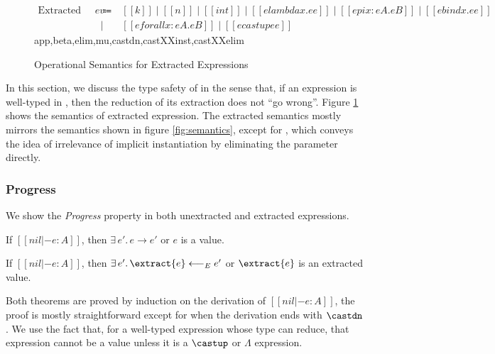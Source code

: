 \begin{figure}
  \centering
  \begin{equation*}
  \begin{array}{lcl}
      \text{Extracted Value} ~ ev & ~ \Coloneqq ~ & [[k]] \mid [[n]] \mid [[int]] \mid [[elambda x. ee]] \mid [[epi x : eA. eB]] \mid [[ebind x. ee]] \\
      & \mid & [[eforall x : eA. eB]] \mid [[ecastup ee]]
  \end{array}
  \end{equation*}
    {app,beta,elim,mu,castdn,castXXinst,castXXelim}
  \label{fig:extract-semantics}
  \caption{Operational Semantics for Extracted Expressions}
\end{figure}

In this section, we discuss the type safety of \name in the sense that,
if an expression is well-typed in \name, then the reduction of its extraction
does not ``go wrong''. Figure \ref{fig:extract-semantics} shows the semantics of
extracted expression. The extracted semantics mostly mirrors the semantics
shown in figure \ref{fig:semantics}, except for , which
conveys the idea of irrelevance of implicit instantiation by eliminating the
parameter directly.

\subsubsection{Progress} We show the \emph{Progress} property in both unextracted
and extracted expressions.

\begin{theorem}[Progress]
    If $[[nil |- e : A]]$,
    then $\exists \, e'. \, e \longrightarrow e'$ or $e$ is a value.
\end{theorem}

\begin{theorem}
    If $[[nil |- e : A]]$,
    then $\exists \, e'. \, \extract{e} \longleftarrow_E e'$ or $\extract{e}$ is an extracted value.
\end{theorem}

Both theorems are proved by induction on the derivation of $[[nil |- e : A]]$,
the proof is mostly straightforward except for when the derivation ends with $\castdn$.
We use the fact that, for a well-typed expression whose type can reduce, that expression
cannot be a value unless it is a $\castup$ or $\Lambda$ expression.

